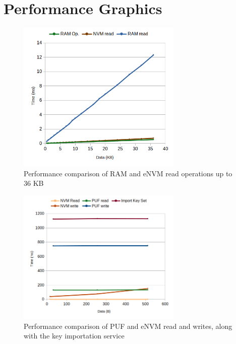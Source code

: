 \chapter{Performance Graphics}
\label{chapter:appendixB}

\begin{figure}[h!]
	\centering
	\includegraphics[width=0.7\textwidth]{./Images/memory-time.png}
	\caption{Performance comparison of RAM and eNVM read operations up to 36 KB}
	\label{fig:performance:memory-time}
\end{figure}

\begin{figure}[h!]
	\centering
	\includegraphics[width=0.7\textwidth]{./Images/nvm-puf-time.png}
	\caption{Performance comparison of PUF and eNVM read and writes, along with the key importation service}
	\label{fig:performance:nvm-puf-time}
\end{figure}

